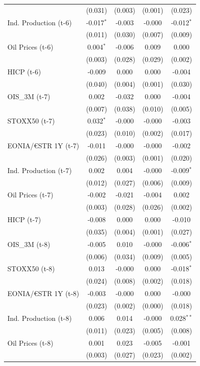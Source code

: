 \begin{longtable}[t]{lcccc}
 & (0.031) & (0.003) & (0.001) & \vphantom{1} (0.023)\\
Ind. Production (t-6) & -0.017$^{*}$ & -0.003 & -0.000 & -0.012$^{*}$\\
 & (0.011) & (0.030) & (0.007) & (0.009)\\
Oil Prices (t-6) & 0.004$^{*}$ & -0.006 & 0.009 & 0.000\\
 & (0.003) & (0.028) & (0.029) & (0.002)\\
HICP (t-6) & -0.009 & 0.000 & 0.000 & -0.004\\
 & (0.040) & (0.004) & (0.001) & (0.030)\\
OIS\_3M (t-7) & 0.002 & -0.032 & 0.000 & -0.004\\
 & (0.007) & (0.038) & (0.010) & (0.005)\\
STOXX50 (t-7) & 0.032$^{*}$ & -0.000 & -0.000 & -0.003\\
 & (0.023) & (0.010) & (0.002) & (0.017)\\
EONIA/€STR 1Y (t-7) & -0.011 & -0.000 & -0.000 & -0.002\\
 & (0.026) & (0.003) & (0.001) & (0.020)\\
Ind. Production (t-7) & 0.002 & 0.004 & -0.000 & -0.009$^{*}$\\
 & (0.012) & (0.027) & (0.006) & (0.009)\\
Oil Prices (t-7) & -0.002 & -0.021 & -0.004 & 0.002\\
 & (0.003) & (0.028) & (0.026) & (0.002)\\
HICP (t-7) & -0.008 & 0.000 & 0.000 & -0.010\\
 & (0.035) & (0.004) & (0.001) & (0.027)\\
OIS\_3M (t-8) & -0.005 & 0.010 & -0.000 & -0.006$^{*}$\\
 & (0.006) & (0.034) & (0.009) & (0.005)\\
STOXX50 (t-8) & 0.013 & -0.000 & 0.000 & -0.018$^{*}$\\
 & (0.024) & (0.008) & (0.002) & (0.018)\\
EONIA/€STR 1Y (t-8) & -0.003 & -0.000 & 0.000 & -0.000\\
 & (0.023) & (0.002) & (0.000) & (0.018)\\
Ind. Production (t-8) & 0.006 & 0.014 & -0.000 & 0.028$^{**}$\\
 & (0.011) & (0.023) & (0.005) & (0.008)\\
Oil Prices (t-8) & 0.001 & 0.023 & -0.005 & -0.001\\
 & (0.003) & (0.027) & (0.023) & (0.002)\\

\end{longtable}
